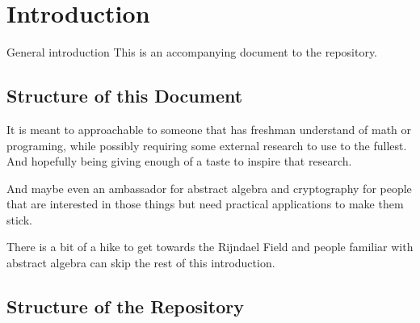 
\chapter{Introduction}
General introduction
This is an accompanying document to the repository.

\section{Structure of this Document}
It is meant to approachable to someone that has freshman understand of math or programing,
while possibly requiring some external research to use to the fullest.
And hopefully being giving enough of a taste to inspire that research.

And maybe even an ambassador for abstract algebra and cryptography for people that are interested in those things but need practical applications to make them stick.

There is a bit of a hike to get towards the Rijndael Field and people familiar with abstract algebra can skip the rest of this introduction.

\section{Structure of the Repository}
